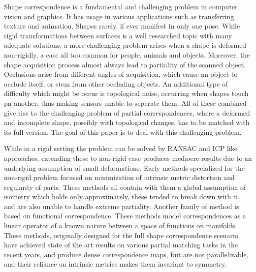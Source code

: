 \documentclass[10pt,twocolumn,letterpaper]{article}
\begin{document}
Shape correspondence is a fundamental and challenging problem in computer vision and graphics. It has usage in various applications such as transferring texture and animation. 
Shapes rarely, if ever manifest in only one pose. While rigid transformations between surfaces is a well researched topic with many adequate solutions, a more challenging problem arises when a shape is deformed non-rigidly, a case all too common for people, animals and objects.
Moreover, the shape acquisition process almost always lead to partiality of the scanned object. Occlusions arise from different angles of acquisition, which cause an object to occlude itself, or stem from other occluding objects. 
An additional type of difficulty which might be occur is topological noise, occurring when shapes touch pn another, thus making  sensors unable to seperate them.
All of these combined give rise to the challenging problem of partial correspondences, where a deformed and incomplete shape, possibly with topological changes, has to be matched with its full version. The goal of this paper is to deal with this challenging problem.

While in a rigid setting the problem can be solved by RANSAC and ICP like approaches\cite{rusu2009fast, holz2015registration}, extending these to non-rigid case produces mediocre results due to an underlying assumption of small deformations. 
Early methods specialized for the non-rigid problem focused on minimization of intrinsic metric distortion\cite{bronstein2006generalized,Torsello:2012:GAD:2354409.2354702} and regularity of parts\cite{Bronstein:2009:PSO:1553357.1553368,bronstein2008not}. These methods all contain with them a global assumption of isometry which holds only approximately, these tended to break down with it, and are also unable to handle extreme partiality. 
Another family of method is based on functional correspondence. These methods model correspondences as a linear operator of a known nature between a space of functions on manifolds\cite{Ovsjanikov:2012:FMF:2185520.2185526}. These methods, originally designed for the full shape correspondence scenario have achieved state of the art results on various partial matching tasks in the recent years\cite{litany2017fully,vestner2017efficient,rodola2017partial}, and produce dense correspondence maps, but are not parallelizable, and their reliance on intrinsic metrics makes them invariant to symmetry. 
\end{document}
